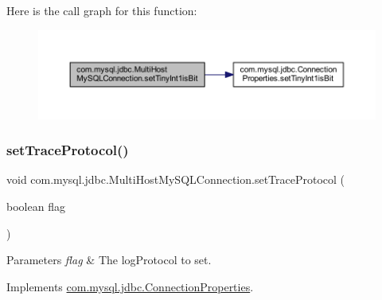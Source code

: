 Here is the call graph for this function\+:
\nopagebreak
\begin{figure}[H]
\begin{center}
\leavevmode
\includegraphics[width=350pt]{classcom_1_1mysql_1_1jdbc_1_1_multi_host_my_s_q_l_connection_a7f6ba35d4da5c8ab2972086f48f02227_cgraph}
\end{center}
\end{figure}
\mbox{\label{classcom_1_1mysql_1_1jdbc_1_1_multi_host_my_s_q_l_connection_aa661c53930b9d9af7528cf6cf24a2fce}} 
\subsubsection{\texorpdfstring{set\+Trace\+Protocol()}{setTraceProtocol()}}
{\footnotesize\ttfamily void com.\+mysql.\+jdbc.\+Multi\+Host\+My\+S\+Q\+L\+Connection.\+set\+Trace\+Protocol (\begin{DoxyParamCaption}\item[{boolean}]{flag }\end{DoxyParamCaption})}


\begin{DoxyParams}{Parameters}
{\em flag} & The log\+Protocol to set. \\
\hline
\end{DoxyParams}


Implements \mbox{\hyperlink{interfacecom_1_1mysql_1_1jdbc_1_1_connection_properties_a304661cd6d7b203e033ad219de96e0d7}{com.\+mysql.\+jdbc.\+Connection\+Properties}}.

